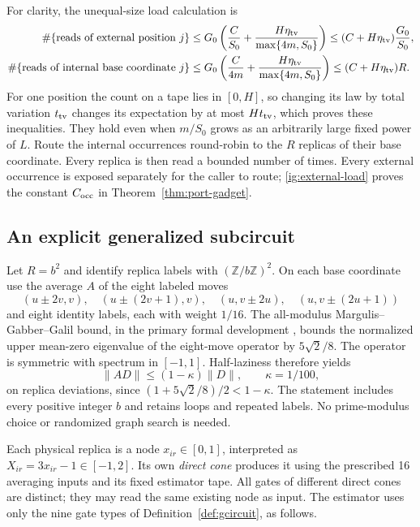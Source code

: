 For clarity, the unequal-size load calculation is
\begin{align}
 \#\{\text{reads of external position }j\}
 &\le G_0\left(\frac C{S_0}
            +\frac{H\eta_{\rm tv}}{\max\{4m,S_0\}}\right)
 \le (C+H\eta_{\rm tv})\frac{G_0}{S_0},
 \label{ig:external-load}\\
 \#\{\text{reads of internal base coordinate }j\}
 &\le G_0\left(\frac C{4m}
            +\frac{H\eta_{\rm tv}}{\max\{4m,S_0\}}\right)
 \le (C+H\eta_{\rm tv})R.
 \label{ig:internal-load}
\end{align}
For one position the count on a tape lies in $[0,H]$, so changing its
law by total variation $t_{\rm tv}$ changes its expectation by at most
$Ht_{\rm tv}$, which proves these inequalities. They hold even when
$m/S_0$ grows as an arbitrarily large fixed power of $L$.
Route the internal occurrences round-robin to the $R$ replicas of their
base coordinate. Every replica is then read a bounded number of times.
Every external occurrence is exposed separately for the caller to route;
\eqref{ig:external-load} proves the constant $C_{\rm occ}$ in
Theorem~\ref{thm:port-gadget}.

\subsection{An explicit generalized subcircuit}

Let $R=b^2$ and identify replica labels with $(\mathbb Z/b\mathbb Z)^2$.
On each base coordinate use the average $A$ of the eight labeled moves
\[
 (u\pm2v,v),\quad (u\pm(2v+1),v),\quad
 (u,v\pm2u),\quad (u,v\pm(2u+1))
\]
and eight identity labels, each with weight $1/16$. The all-modulus
Margulis--Gabber--Galil bound, in the primary formal development
\cite[\texttt{mgg\_numerical\_radius}]{MGGAFP}, bounds the normalized
upper mean-zero eigenvalue of the eight-move operator by $5\sqrt2/8$.
The operator is symmetric with spectrum in $[-1,1]$. Half-laziness
therefore yields
\begin{equation}\label{ig:replica-gap}
 \|AD\|\le(1-\kappa)\|D\|,\qquad \kappa=1/100,
\end{equation}
on replica deviations, since $(1+5\sqrt2/8)/2<1-\kappa$.
The statement includes every positive integer $b$ and retains loops
and repeated labels. No prime-modulus choice or randomized graph search
is needed.

Each physical replica is a node $x_{ir}\in[0,1]$, interpreted as
$X_{ir}=3x_{ir}-1\in[-1,2]$. Its own \emph{direct cone} produces it
using the prescribed 16 averaging inputs and its fixed estimator tape.
All gates of different direct cones are distinct; they may read the
same existing node as input. The estimator uses only the nine gate types
of Definition~\ref{def:gcircuit}, as follows.

